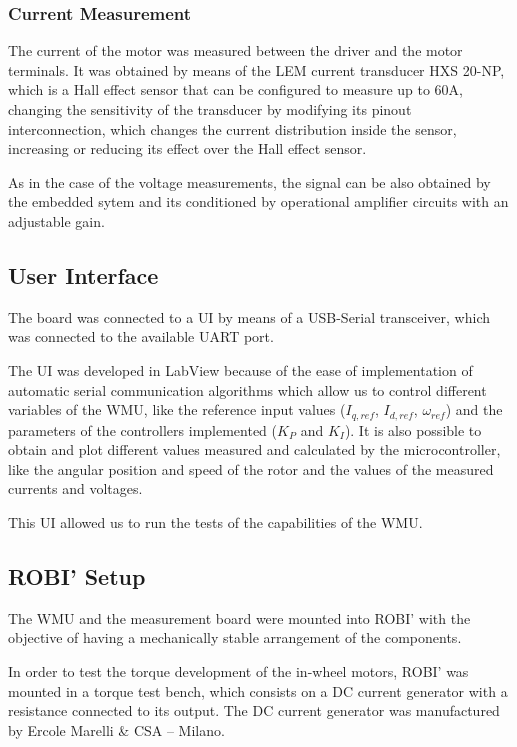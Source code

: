 \subsubsection{Current Measurement}

The current of the motor was measured between the driver and the motor terminals. It was obtained by means of the LEM current transducer HXS 20-NP, which is a Hall effect sensor that can be configured to measure up to 60A, changing the sensitivity of the transducer by modifying its pinout interconnection, which changes the current distribution inside the sensor, increasing or reducing its effect over the Hall effect sensor.

As in the case of the voltage measurements, the signal can be also obtained by the embedded sytem and its conditioned by operational amplifier circuits with an adjustable gain.

\subsection{User Interface}

The board was connected to a \ac{UI} by means of a USB-Serial transceiver, which was connected to the available \ac{UART} port.

The \ac{UI} was developed in LabView because of the ease of implementation of automatic serial communication algorithms which allow us to control different variables of the \ac{WMU}, like the reference input values ($I_{q,ref}$, $I_{d,ref}$, $\omega_{ref}$) and the parameters of the controllers implemented ($K_{P}$ and $K_{I}$). It is also possible to obtain and plot different values measured and calculated by the microcontroller, like the angular position and speed of the rotor and the values of the measured currents and voltages.

This \ac{UI} allowed us to run the tests of the capabilities of the \ac{WMU}.

\subsection{ROBI' Setup}

The \ac{WMU} and the measurement board were mounted into ROBI' with the objective of having a mechanically stable arrangement of the components.

In order to test the torque development of the in-wheel motors, ROBI' was mounted in a torque test bench, which consists on a \ac{DC} current generator with a resistance connected to its output. The \ac{DC} current generator was manufactured by Ercole Marelli \& CSA -- Milano.

